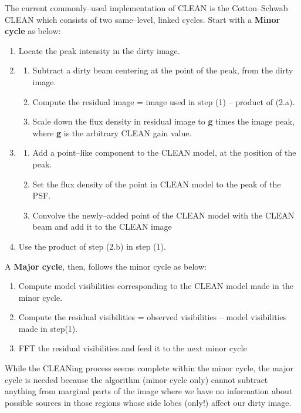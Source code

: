 \documentclass[a4wide,12pt]{book}
\begin{document}
{The current commonly--used implementation of CLEAN is the Cotton--Schwab CLEAN which consists of two same--level, linked cycles.
Start with a {\bf Minor cycle} as below:
\begin{enumerate}
\item Locate the peak intensity in the dirty image.
\item\begin{enumerate}
    \item Subtract a dirty beam centering at the point of the peak, from the dirty image.
    \item Compute the residual image = image used in step (1) -- product of (2.a).
    \item Scale down the flux density in residual image to {\bf g} times the image peak, where {\bf g} is the arbitrary CLEAN gain value.
    \end{enumerate}
\item\begin{enumerate}
    \item Add a point--like component to the CLEAN model, at the position of the peak.
    \item Set the flux density of the point in CLEAN model to the peak of the PSF.
    \item Convolve the newly--added point of the CLEAN model with the CLEAN beam and add it to the CLEAN image
    \end{enumerate}
\item Use the product of step (2.b) in step (1). 
\end{enumerate}
A {\bf Major cycle}, then, follows the minor cycle as below:
\begin{enumerate}
\item Compute model visibilities corresponding to the CLEAN model made in the minor cycle.
\item Compute the residual visibilities = observed visibilities -- model visibilities made in step(1).
\item FFT the residual visibilities and feed it to the next minor cycle 
\end{enumerate}

While the CLEANing process seems complete within the minor cycle, the major cycle is needed because the algorithm (minor cycle only) cannot subtract anything from marginal parts of the image where we have no information about possible sources in those regions whose side lobes (only!) affect our dirty image.

}
\end{document}
